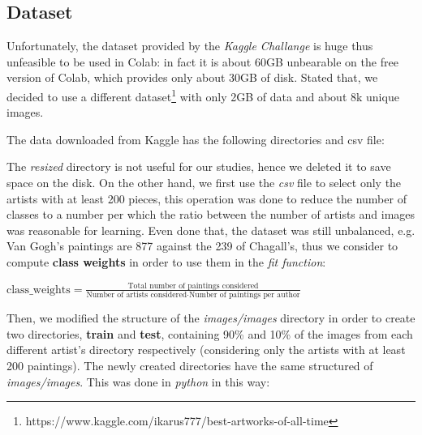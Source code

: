 \subsection{Dataset}
Unfortunately, the dataset provided by the \textit{Kaggle Challange} is huge thus unfeasible to be used in Colab: in fact it is about 60GB unbearable on the free version of Colab, which provides only about 30GB of disk. Stated that, we decided to use a different dataset\footnote{https://www.kaggle.com/ikarus777/best-artworks-of-all-time} with only 2GB of data and about 8k unique images.

\noindent The data downloaded from Kaggle has the following directories and csv file:

\noindent The \textit{resized} directory is not useful for our studies, hence we deleted it to save space on the disk. On the other hand, we first use the \textit{csv} file to select only the artists with at least 200 pieces, this operation was done to reduce the number of classes to a number per which the ratio between the number of artists and images was reasonable for learning. Even done that, the dataset was still unbalanced, e.g. Van Gogh's paintings are 877 against the 239 of Chagall's, thus we consider to compute \textbf{class weights} in order to use them in the \textit{fit function}:

$
	\text{class\_weights} = \frac{\text{Total number of paintings considered}}{\text{Number of artists considered}\cdot \text{Number of paintings per author}}
$

\noindent Then, we modified the structure of the \textit{images/images} directory in order to create two directories, \textbf{train} and \textbf{test}, containing 90\% and 10\% of the images from each different artist's directory respectively (considering only the artists with at least 200 paintings). The newly created directories have the same structured of \textit{images/images}. This was done in \textit{python} in this way:


